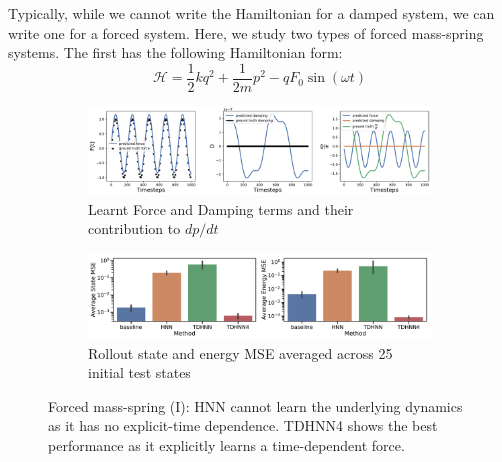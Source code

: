 \documentclass[twoside]{article}
\begin{document}
Typically, while we cannot write the Hamiltonian for a damped system, we can write one for a forced system. Here, we study two types of forced mass-spring systems. The first has the following Hamiltonian form:
\begin{equation}
\mathcal{H} = \frac{1}{2}kq^2 + \frac{1}{2m}p^2 - qF_0\sin(\omega t) 
\end{equation}
\begin{figure}[h!]
\centering
\captionsetup{justification=centering}
	\begin{subfigure}[b]{0.48\textwidth}
		\centering
		\includegraphics[width=\textwidth]{figures/figures/forced_mass_spring/1/forced_mass_spring_dpdt_0.pdf}
		\caption{Learnt Force and Damping terms and their contribution to $dp/dt$}
	\end{subfigure}
	\begin{subfigure}[b]{0.48\textwidth}
	    \centering
		\includegraphics[width=\textwidth]{figures/figures/forced_mass_spring/1/forced_mass_spring_errors_0.pdf}
		\caption{Rollout state and energy MSE averaged across 25 initial test states}
	\end{subfigure}
\caption{Forced mass-spring (I): HNN cannot learn the underlying dynamics as it has no explicit-time dependence. TDHNN4 shows the best performance as it explicitly learns a time-dependent force.}
\label{fig.fmspring1}
\end{figure}
\end{document}
